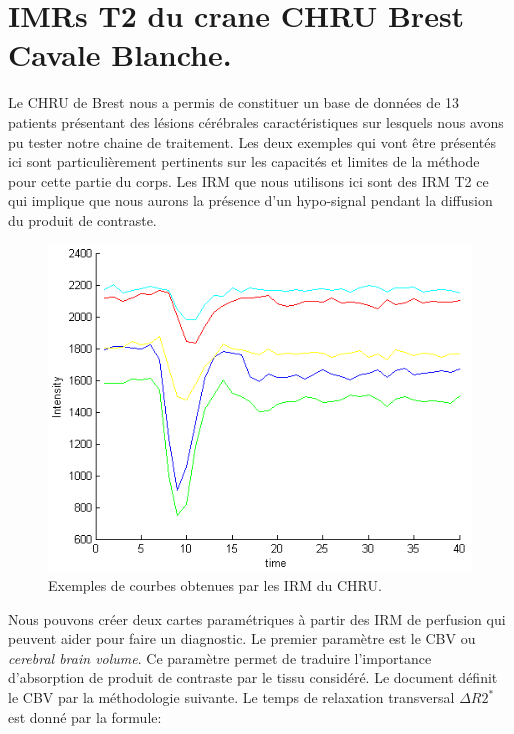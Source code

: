 \chapter{IMRs T2 du crane CHRU Brest Cavale Blanche.}

Le CHRU de Brest nous a permis de constituer un base de données de 13 patients présentant des lésions cérébrales caractéristiques sur lesquels nous avons pu tester notre chaine de traitement. Les deux exemples qui vont être présentés ici sont particulièrement pertinents sur les capacités et limites de la méthode pour cette partie du corps. Les IRM que nous utilisons ici sont des IRM T2 ce qui implique que nous aurons la présence d'un hypo-signal pendant la diffusion du produit de contraste.

\begin{figure}[H]
\centering
    \includegraphics[scale=0.8,angle=0]{Images/CourbeExample.png}
    \caption{Exemples de courbes obtenues par les IRM du CHRU.}
    \label{fig:CourbeExample}
\end{figure}

Nous pouvons créer deux cartes paramétriques à partir des IRM de perfusion qui peuvent aider pour faire un diagnostic. Le premier paramètre est le CBV ou \textit{cerebral brain volume}. Ce paramètre permet de traduire l'importance d'absorption de produit de contraste par le tissu considéré. Le document \cite{muir2014quantitative} définit le CBV par la méthodologie suivante. Le temps de relaxation transversal $\Delta R2^*$ est donné par la formule:


